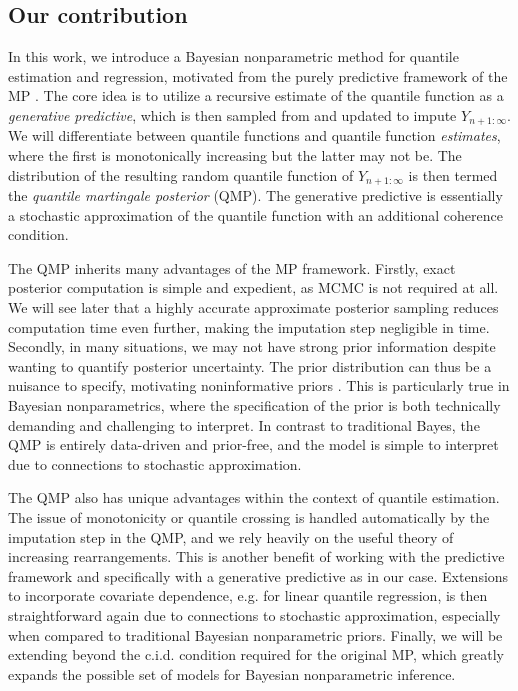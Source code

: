 \documentclass[11pt,a4paper]{article}
\begin{document}
\subsection{Our contribution}
In this work, we introduce a Bayesian nonparametric method for quantile estimation and regression, motivated from the purely predictive framework of the MP \citep{Fong2023a}. The core idea is to utilize a recursive {estimate} of the quantile function as a \textit{generative predictive}, which is then sampled from and updated to impute $Y_{n+1:\infty}$. 
We will differentiate between quantile functions and quantile function \textit{estimates}, where the first is monotonically increasing but the latter may not be.
 The distribution of the resulting random quantile function of $Y_{n+1:\infty}$ is then termed the \textit{quantile martingale posterior} (QMP).
The generative predictive is essentially a stochastic approximation of the quantile function with an additional coherence condition. 

{The QMP inherits many advantages of the MP framework. Firstly, exact posterior computation is simple and expedient, as MCMC is not required at all. We will see later that a highly accurate approximate posterior sampling reduces computation time even further, making the imputation step negligible in time. Secondly, in many situations, we may not have strong prior information despite wanting to quantify posterior uncertainty. The prior distribution can thus be a nuisance to specify, motivating noninformative priors \citep{Berger2009}. This is particularly true in Bayesian nonparametrics, where the specification of the prior is both technically demanding and challenging to interpret. In contrast to traditional Bayes, the QMP is entirely data-driven and prior-free, and the model is simple to interpret due to connections to stochastic approximation.}

{
The QMP also has unique advantages within the context of quantile estimation.} The issue of monotonicity or quantile crossing is handled automatically by the imputation step in the QMP, and we rely heavily on the useful theory of increasing rearrangements. This is another benefit of working with the predictive framework and specifically with a generative predictive as in our case.
Extensions to incorporate covariate dependence, e.g. for linear quantile regression, is then straightforward again due to connections to stochastic approximation, especially when compared to traditional Bayesian nonparametric priors. Finally, we will be extending beyond the c.i.d. condition required for the original MP, which greatly expands the possible set of models for Bayesian nonparametric inference. 
\end{document}
